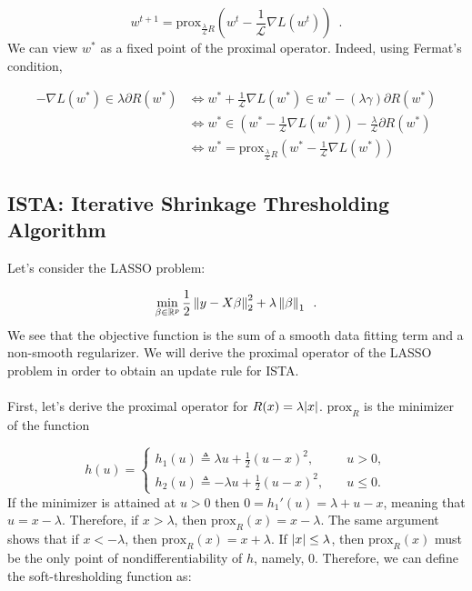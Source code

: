\documentclass[a4paper,10pt]{article}
\theoremstyle{definition}
\begin{document}
\begin{equation*}
    w^{t+1} = \text{prox}_{\frac{\lambda}{\mathcal{L}}R}
    (w^t - \frac{1}{\mathcal{L}}\nabla L(w^{t}))
    \enspace .
\end{equation*}
%
We can view $w^*$ as a fixed point of the proximal operator. Indeed, using Fermat's condition,

\begin{align*}
    -\nabla L(w^*) \in \lambda \partial R(w^*)
    & \iff w^* + \frac{1}{\mathcal{L}} \nabla L(w^*) \in w^* - (\lambda\gamma) \partial R(w^*) \\
    & \iff w^* \in (w^* - \frac{1}{\mathcal{L}} \nabla L(w^*)) - \frac{\lambda}{\mathcal{L}} \partial R(w^*) \\
    & \iff w^* = \text{prox}_{\frac{\lambda}{\mathcal{L}} R}(w^* - \frac{1}{\mathcal{L}} \nabla L(w^*))
\end{align*}

\subsection*{ISTA: Iterative Shrinkage Thresholding Algorithm}
\label{ista}

Let's consider the LASSO problem:

\begin{equation*}
    \min_{\beta \in \mathbb{R}^p} \frac{1}{2}
    \left \lVert y - X\beta \right \rVert_2^2
    + \lambda \left \lVert \beta \right \rVert_1
    \enspace .
\end{equation*}
%
We see that the objective function is the sum of a smooth data fitting term and
a non-smooth regularizer. We will derive the proximal operator of the LASSO problem 
in order to obtain an update rule for ISTA.
\\
\\
First, let's derive the proximal operator for $R(x)=\lambda\lvert x \rvert$. $\text{prox}_R$ is the
minimizer of the function

\begin{equation*}
    h(u) = \begin{cases}
        h_1(u) \triangleq \lambda u + \frac{1}{2}(u-x)^2, \quad &u > 0, \\
        h_2(u) \triangleq -\lambda u + \frac{1}{2}(u-x)^2, \quad &u \leq 0.
    \end{cases}
\end{equation*}
%
If the minimizer is attained at $u > 0$ then $0 = h_1'(u)=\lambda + u - x$, meaning that
$u = x - \lambda$. Therefore, if $x > \lambda$, then $\text{prox}_R(x)=x-\lambda$. The same 
argument shows that if $x < -\lambda$, then $\text{prox}_R(x)=x+\lambda$. If $\lvert x \rvert \leq \lambda$,
then $\text{prox}_R(x)$ must be the only point of nondifferentiability of $h$, namely, 0.
Therefore, we can define the soft-thresholding function as:
\end{document}
